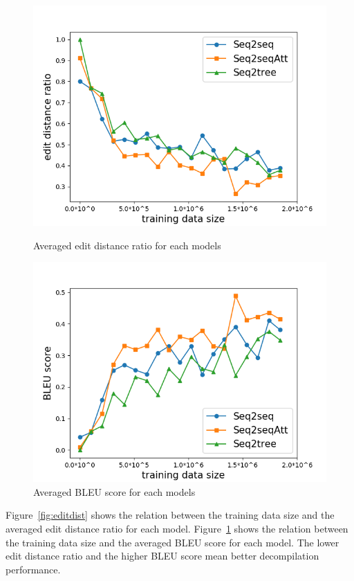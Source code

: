 \documentclass[senior,final,11pt]{iscs-thesis}
\begin{document}
\begin{figure}[]
	\includegraphics[width=12cm]{edit_dist.png}
	\caption{Averaged edit distance ratio for each models}
	\label{fig:editdist}
	\includegraphics[width=12cm]{bleu.png}
	\caption{Averaged BLEU score for each models}
	\label{fig:bleu}
\end{figure}

Figure~\ref{fig:editdist} shows the relation between the training data size and the averaged edit distance ratio for each model.
Figure~\ref{fig:bleu} shows the relation between the training data size and the averaged BLEU score for each model.
The lower edit distance ratio and the higher BLEU score mean better decompilation performance.
\end{document}
